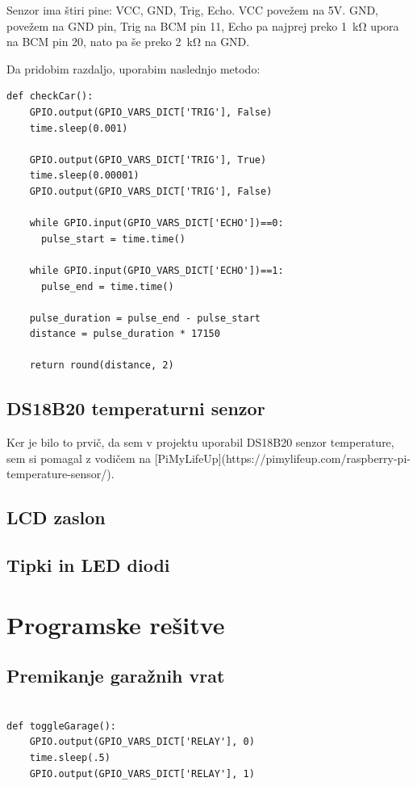 \documentclass[11pt]{article}
\begin{document}
Senzor ima štiri pine: VCC, GND, Trig, Echo. VCC povežem na 5V. GND, povežem na GND pin, Trig na BCM pin 11, Echo pa najprej preko \SI{1}{\kohm} upora na BCM pin 20, nato pa še preko \SI{2}{\kohm} na GND.

Da pridobim razdaljo, uporabim naslednjo metodo:
\begin{verbatim}
def checkCar():  
    GPIO.output(GPIO_VARS_DICT['TRIG'], False)
    time.sleep(0.001)

    GPIO.output(GPIO_VARS_DICT['TRIG'], True)
    time.sleep(0.00001)
    GPIO.output(GPIO_VARS_DICT['TRIG'], False)

    while GPIO.input(GPIO_VARS_DICT['ECHO'])==0:
      pulse_start = time.time()

    while GPIO.input(GPIO_VARS_DICT['ECHO'])==1:
      pulse_end = time.time()

    pulse_duration = pulse_end - pulse_start
    distance = pulse_duration * 17150

    return round(distance, 2)
\end{verbatim}

\subsection{DS18B20 temperaturni senzor}
Ker je bilo to prvič, da sem v projektu uporabil DS18B20 senzor temperature, sem si pomagal z vodičem na [PiMyLifeUp](https://pimylifeup.com/raspberry-pi-temperature-sensor/).

\subsection{LCD zaslon}
\subsection{Tipki in LED diodi}

\section{Programske rešitve}
\subsection{Premikanje garažnih vrat}
\begin{verbatim}
  
def toggleGarage():
    GPIO.output(GPIO_VARS_DICT['RELAY'], 0)
    time.sleep(.5)
    GPIO.output(GPIO_VARS_DICT['RELAY'], 1)
\end{verbatim}
\end{document}
